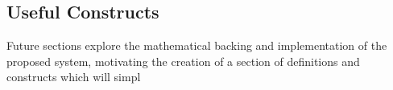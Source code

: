 \subsection{Useful Constructs}

Future sections explore the mathematical backing and implementation of the proposed system, motivating the creation of a section of definitions and constructs which will simpl